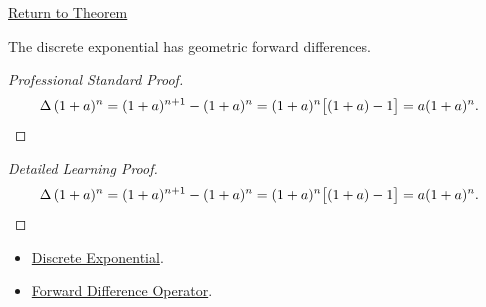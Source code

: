 \newpage
{}
\label{prf:discrete-exponential-rule}

\begin{remark*}[Return]
\hyperref[prop:discrete-exponential-rule]{Return to Theorem}
\end{remark*}

\begin{proposition*}
The discrete exponential has geometric forward differences.
\end{proposition*}

\begin{proof}[Professional Standard Proof]
\LRAProofBodyStart
\[
\Delta\,(1+a)^n = (1+a)^{n+1} - (1+a)^n = (1+a)^n\bigl[(1+a)-1\bigr] = a(1+a)^n.
\qedhere
\]
\end{proof}

\begin{proof}[Detailed Learning Proof]
\LRAProofBodyStart
\[
\Delta\,(1+a)^n = (1+a)^{n+1} - (1+a)^n = (1+a)^n\bigl[(1+a)-1\bigr] = a(1+a)^n.
\qedhere
\]
\end{proof}

\begin{remark*}
\end{remark*}

\begin{dependencies}
\begin{itemize}
  \item \hyperref[def:discrete-exponential]{Discrete Exponential}.
  \item \hyperref[def:forward-difference]{Forward Difference Operator}.
\end{itemize}
\end{dependencies}
\clearpage
